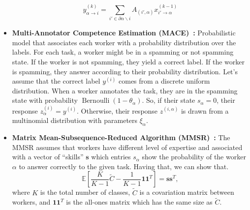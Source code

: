 \begin{itemize}
\begin{equation}
        y_{\alpha \rightarrow i}^{(k)} = \sum_{i' \in \partial \alpha \backslash i} A_{(i',\alpha)} x_{i' \rightarrow \alpha}^{(k-1)}
    \end{equation}
    \item \textbf{Multi-Annotator Competence Estimation (MACE)~\cite{hovy_MACE_2013,crowdkit_webpage_documentation}:}
    Probabilistic model that associates each worker with a probability distribution over the labels. For each task, a worker might be in a spamming or not spamming state. If the worker is not spamming, they yield a correct label. If the worker is spamming, they answer according to their probability distribution. Let's assume that the correct label $y^{(i)}$ comes from a discrete uniform distribution. When a worker annotates the task, they are in the spamming state with probability $\operatorname{Bernoulli}(1 - \theta_{\alpha})$. So, if their state $s_{\alpha} = 0$, their response $z^{(i)}_{\alpha} = y^{(i)}$. Otherwise, their response $z^{(i,\alpha)}$ is drawn from a multinomial distribution with parameters $\xi_{\alpha}$.
    \item \textbf{Matrix Mean-Subsequence-Reduced Algorithm (MMSR)~\cite{ma_Adversarial_2020,crowdkit_webpage_documentation}:} The MMSR assumes that workers have different level of expertise and associated with a vector of ``skills'' $\boldsymbol{s}$ which entries $s_{\alpha}$ show the probability of the worker $\alpha$ to answer correctly to the given task. Having that, we can show that.
    \begin{equation}
        \mathbb{E}\left[\frac{K}{K-1}\widetilde{C}-\frac{1}{K-1}\boldsymbol{1}\boldsymbol{1}^T\right]
        = \boldsymbol{s}\boldsymbol{s}^T,
    \end{equation}
    where $K$ is the total number of classes, $\widetilde{C}$ is a covariation matrix between workers, and $\boldsymbol{1}\boldsymbol{1}^T$ is the all-ones matrix which has the same size as $\widetilde{C}$.


\end{itemize}
